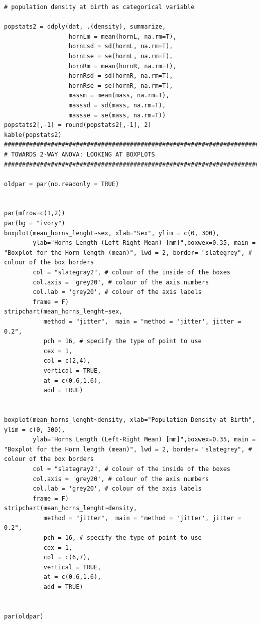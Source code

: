 \documentclass{article}
\begin{document}
\begin{verbatim}
# population density at birth as categorical variable

popstats2 = ddply(dat, .(density), summarize,
                  hornLm = mean(hornL, na.rm=T),
                  hornLsd = sd(hornL, na.rm=T),
                  hornLse = se(hornL, na.rm=T),
                  hornRm = mean(hornR, na.rm=T),
                  hornRsd = sd(hornR, na.rm=T),
                  hornRse = se(hornR, na.rm=T),
                  massm = mean(mass, na.rm=T),
                  masssd = sd(mass, na.rm=T),
                  massse = se(mass, na.rm=T))
popstats2[,-1] = round(popstats2[,-1], 2)
kable(popstats2)
################################################################################
# TOWARDS 2-WAY ANOVA: LOOKING AT BOXPLOTS
################################################################################

oldpar = par(no.readonly = TRUE)


par(mfrow=c(1,2))
par(bg = "ivory")
boxplot(mean_horns_lenght~sex, xlab="Sex", ylim = c(0, 300),
        ylab="Horns Length (Left-Right Mean) [mm]",boxwex=0.35, main = "Boxplot for the Horn length (mean)", lwd = 2, border= "slategrey", # colour of the box borders
        col = "slategray2", # colour of the inside of the boxes
        col.axis = 'grey20', # colour of the axis numbers 
        col.lab = 'grey20', # colour of the axis labels
        frame = F)
stripchart(mean_horns_lenght~sex,
           method = "jitter",  main = "method = 'jitter', jitter = 0.2",
           pch = 16, # specify the type of point to use
           cex = 1,
           col = c(2,4),
           vertical = TRUE,
           at = c(0.6,1.6),
           add = TRUE)


boxplot(mean_horns_lenght~density, xlab="Population Density at Birth", ylim = c(0, 300),
        ylab="Horns Length (Left-Right Mean) [mm]",boxwex=0.35, main = "Boxplot for the Horn length (mean)", lwd = 2, border= "slategrey", # colour of the box borders
        col = "slategray2", # colour of the inside of the boxes
        col.axis = 'grey20', # colour of the axis numbers 
        col.lab = 'grey20', # colour of the axis labels
        frame = F)
stripchart(mean_horns_lenght~density,
           method = "jitter",  main = "method = 'jitter', jitter = 0.2",
           pch = 16, # specify the type of point to use
           cex = 1,
           col = c(6,7),
           vertical = TRUE, 
           at = c(0.6,1.6),
           add = TRUE)


par(oldpar)




\end{verbatim}
\end{document}
